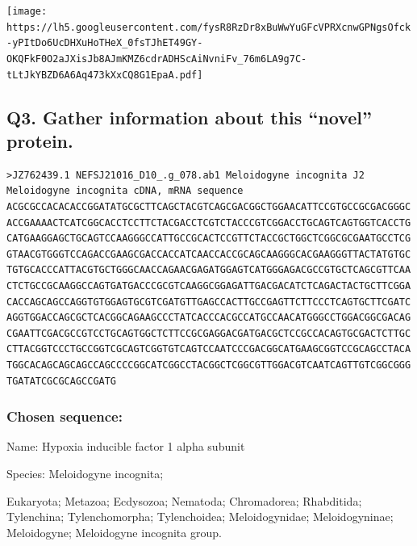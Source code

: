\documentclass[
  letterpaper,
  DIV=11,
  numbers=noendperiod]{scrartcl}
\begin{document}
\texttt{[image: https://lh5.googleusercontent.com/fysR8RzDr8xBuWwYuGFcVPRXcnwGPNgsOfck-yPItDo6UcDHXuHoTHeX\_0fsTJhET49GY-OKQFkF0O2aJXisJb8AJmKMZ6cdrADHScAiNvniFv\_76m6LA9g7C-tLtJkYBZD6A6Aq473kXxCQ8G1EpaA.pdf]}

\hypertarget{q3.-gather-information-about-this-novel-protein.}{%
\subsection{\texorpdfstring{Q3. \textbf{Gather information about this
``novel''
protein.}}{Q3. Gather information about this ``novel'' protein.}}\label{q3.-gather-information-about-this-novel-protein.}}

\begin{verbatim}
>JZ762439.1 NEFSJ21016_D10_.g_078.ab1 Meloidogyne incognita J2 Meloidogyne incognita cDNA, mRNA sequence
ACGCGCCACACACCGGATATGCGCTTCAGCTACGTCAGCGACGGCTGGAACATTCCGTGCCGCGACGGGC
ACCGAAAACTCATCGGCACCTCCTTCTACGACCTCGTCTACCCGTCGGACCTGCAGTCAGTGGTCACCTG
CATGAAGGAGCTGCAGTCCAAGGGCCATTGCCGCACTCCGTTCTACCGCTGGCTCGGCGCGAATGCCTCG
GTAACGTGGGTCCAGACCGAAGCGACCACCATCAACCACCGCAGCAAGGGCACGAAGGGTTACTATGTGC
TGTGCACCCATTACGTGCTGGGCAACCAGAACGAGATGGAGTCATGGGAGACGCCGTGCTCAGCGTTCAA
CTCTGCCGCAAGGCCAGTGATGACCCGCGTCAAGGCGGAGATTGACGACATCTCAGACTACTGCTTCGGA
CACCAGCAGCCAGGTGTGGAGTGCGTCGATGTTGAGCCACTTGCCGAGTTCTTCCCTCAGTGCTTCGATC
AGGTGGACCAGCGCTCACGGCAGAAGCCCTATCACCCACGCCATGCCAACATGGGCCTGGACGGCGACAG
CGAATTCGACGCCGTCCTGCAGTGGCTCTTCCGCGAGGACGATGACGCTCCGCCACAGTGCGACTCTTGC
CTTACGGTCCCTGCCGGTCGCAGTCGGTGTCAGTCCAATCCCGACGGCATGAAGCGGTCCGCAGCCTACA
TGGCACAGCAGCAGCCAGCCCCGGCATCGGCCTACGGCTCGGCGTTGGACGTCAATCAGTTGTCGGCGGG
TGATATCGCGCAGCCGATG
\end{verbatim}

\hypertarget{chosen-sequence}{%
\subsubsection{Chosen sequence:}\label{chosen-sequence}}

Name: Hypoxia inducible factor 1 alpha subunit

Species: Meloidogyne incognita;

Eukaryota; Metazoa; Ecdysozoa; Nematoda; Chromadorea; Rhabditida;
Tylenchina; Tylenchomorpha; Tylenchoidea; Meloidogynidae;
Meloidogyninae; Meloidogyne; Meloidogyne incognita group.
\end{document}
